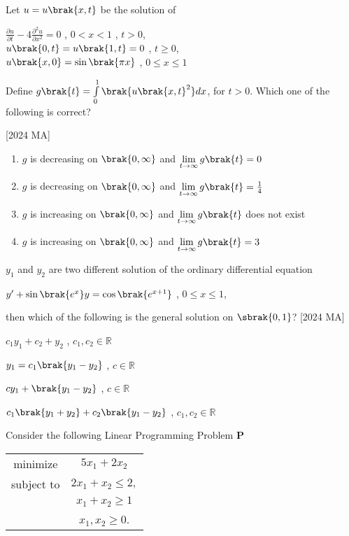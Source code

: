 \item Let $u = u\brak{x,t}$ be the solution of 
\begin{center}
    $\frac{\partial u}{\partial t} - 4 \frac{\partial^2 u}{\partial x^2} = 0$ , $0 < x < 1$ , $t > 0$, \\
    $u\brak{0,t} = u\brak{1,t} = 0$ , $ t \geq 0$, \\
    $u\brak{x,0} = \sin \brak{\pi x}$ , $ 0 \leq x \leq 1$ 
\end{center}
Define $g\brak{t} = \int \limits_0^1 \brak{u \brak{x,t}^2} dx$, for $t > 0$. Which one of the following is correct?  

\hfill [2024 MA]
\begin{enumerate}
    \item $g$ is decreasing on $\brak{0 , \infty}$ and $\lim \limits_{t \to \infty} g \brak{t} = 0$
    \item $g$ is decreasing on $\brak{0 , \infty}$ and $\lim \limits_{t \to \infty} g \brak{t} = \frac{1}{4}$
    \item $g$ is increasing on $\brak{0 , \infty}$ and $\lim \limits_{t \to \infty} g \brak{t} $ does not exist 
    \item $g$ is increasing on $\brak{0 , \infty}$ and $\lim \limits_{t \to \infty} g \brak{t} = 3$
\end{enumerate}
\item  $y_1$ and $y_2$ are two different solution of the ordinary differential equation 
\begin{center}
    $y^\prime + \sin \brak{e^x} y = \cos \brak{e^{x+1}}$ , $ 0 \leq x \leq 1$, 
\end{center}
then which of the following is the general solution on $\sbrak{0,1}$? \hfill [2024 MA]
\begin{enumerate}
    \begin{multicols}{2}
        \item $c_1 y_1 + c_2 + y_2$ , $c_1, c_2 \in \mathbb{R}$
        \item $y_1 = c_1 \brak{y_1 - y_2}$ , $c \in \mathbb{R}$
        \item $cy_1 + \brak{y_1 - y_2}$ , $c \in \mathbb{R}$
        \item $c_1 \brak{y_1 + y_2} + c_2 \brak{y_1 - y_2}$ , $c_1 , c_2 \in \mathbb{R}$
    \end{multicols}
\end{enumerate}
\item Consider the following Linear Programming Problem \textbf{P}
\begin{table}[H]
    \centering
   \begin{tabular}{c c}
minimize & $5x_1 + 2x_2$\\
subject to & $2x_1 + x_2 \leq 2,$ \\
 & $x_1 + x_2 \geq 1$\\
 & $x_1 , x_2 \geq 0$.
\end{tabular}
\end{table}
